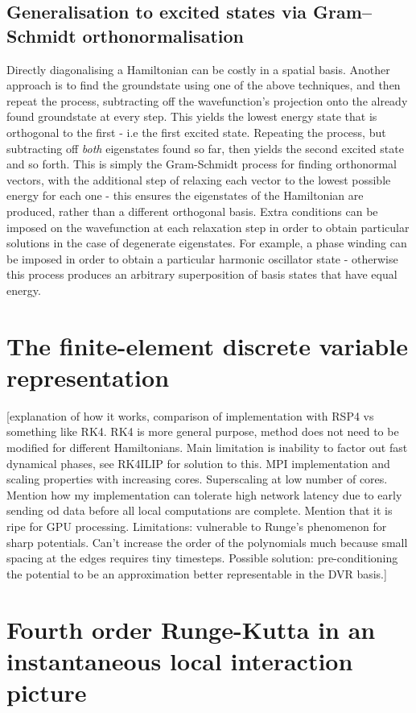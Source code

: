 \subsection{Generalisation to excited states via Gram–Schmidt orthonormalisation}
Directly diagonalising a Hamiltonian can be costly in a spatial basis. Another approach is to find the groundstate using one of the above techniques, and then repeat the process, subtracting off the wavefunction's projection onto the already found groundstate at every step. This yields the lowest energy state that is orthogonal to the first - i.e the first excited state. Repeating the process, but subtracting off \emph{both} eigenstates found so far, then yields the second excited state and so forth. This is simply the Gram-Schmidt process for finding orthonormal vectors, with the additional step of relaxing each vector to the lowest possible energy for each one - this ensures the eigenstates of the Hamiltonian are produced, rather than a different orthogonal basis. Extra conditions can be imposed on the wavefunction at each relaxation step in order to obtain particular solutions in the case of degenerate eigenstates. For example, a phase winding can be imposed in order to obtain a particular harmonic oscillator state - otherwise this process produces an arbitrary superposition of basis states that have equal energy.

\section{The finite-element discrete variable representation}

[explanation of how it works, comparison of implementation with RSP4 vs something like RK4. RK4 is more general purpose, method does not need to be modified for different Hamiltonians. Main limitation is inability to factor out fast dynamical phases, see RK4ILIP for solution to this. MPI implementation and scaling properties with increasing cores. Superscaling at low number of cores. Mention how my implementation can tolerate high network latency due to early sending od data before all local computations are complete. Mention that it is ripe for GPU processing. Limitations: vulnerable to Runge's phenomenon for sharp potentials. Can't increase the order of the polynomials much because small spacing at the edges requires tiny timesteps. Possible solution: pre-conditioning the potential to be an approximation better representable in the DVR basis.]


\section{Fourth order Runge-Kutta in an instantaneous local interaction picture}

